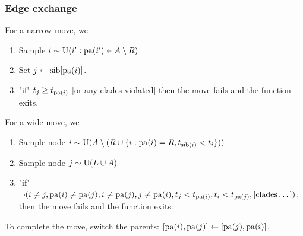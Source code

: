 \documentclass[11pt,a4paper]{article}
\begin{document}
\subsubsection{Edge exchange}

%

For a narrow move, we
\begin{enumerate}
    \item Sample $ i \sim \mathrm{U}(i' : \operatorname*{\mathrm{pa}}(i') \in A \setminus R) $
    \item Set $ j \leftarrow \operatorname*{\mathrm{sib}}[\operatorname*{\mathrm{pa}}(i)] $.
    \item "if" $ t_j \geq t_{\operatorname*{\mathrm{pa}}(i)} $ [or any clades violated] then the move fails and the function exits.
\end{enumerate}
For a wide move, we
\begin{enumerate}
    \item Sample node $ i \sim \mathrm{U}(A \setminus (R \cup \{i : \operatorname*{\mathrm{pa}}(i) = R, t_{\operatorname*{\mathrm{sib}}(i)} < t_i\})) $
    \item Sample node $ j \sim \mathrm{U}(L \cup A) $
    \item "if" $ \lnot(i \neq j, \operatorname*{\mathrm{pa}}(i) \neq \operatorname*{\mathrm{pa}}(j), i \neq \operatorname*{\mathrm{pa}}(j), j \neq \operatorname*{\mathrm{pa}}(i), t_j < t_{\operatorname*{\mathrm{pa}}(i)}, t_i < t_{\operatorname*{\mathrm{pa}}(j)}, [\text{clades}\dots]) $, then the move fails and the function  exits.
\end{enumerate}
To complete the move, switch the parents: $ [\operatorname*{\mathrm{pa}}(i), \operatorname*{\mathrm{pa}}(j)] \leftarrow [\operatorname*{\mathrm{pa}}(j), \operatorname*{\mathrm{pa}}(i)] $.
\end{document}
